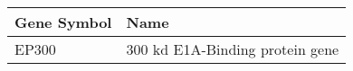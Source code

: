 \begin{tabular}{ll}
\toprule
Gene Symbol &                            Name \\
\midrule
      EP300 & 300 kd E1A-Binding protein gene \\
\bottomrule
\end{tabular}
